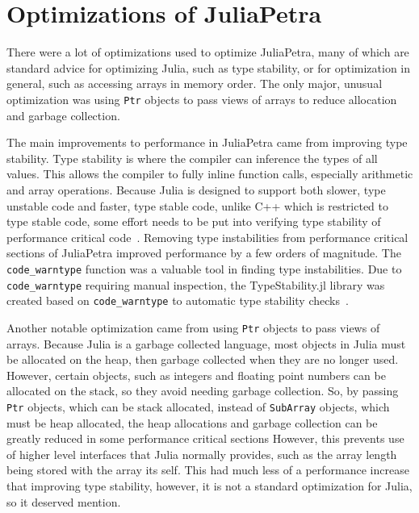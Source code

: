 \documentclass[acmsmall]{acmart}
\newcommand{\snippet}[1]{\lstinline{#1}}
\begin{document}
	\section{Optimizations of JuliaPetra}
	
	There were a lot of optimizations used to optimize JuliaPetra, many of which are standard advice for optimizing Julia, such as type stability, or for optimization in general, such as accessing arrays in memory order.
	The only major, unusual optimization was using \snippet{Ptr} objects to pass views of arrays to reduce allocation and garbage collection.
	
	The main improvements to performance in JuliaPetra came from improving type stability.
	Type stability is where the compiler can inference the types of all values.
	This allows the compiler to fully inline function calls, especially arithmetic and array operations.
	Because Julia is designed to support both slower, type unstable code and faster, type stable code,
	unlike C++ which is restricted to type stable code, some effort needs to be put into verifying
	type stability of performance critical code~\cite{Bezanson:2017:FreshApproach}.
	Removing type instabilities from performance critical sections of JuliaPetra improved performance
	by a few orders of magnitude.
	The \snippet{code_warntype} function was a valuable tool in finding type instabilities.
	Due to \snippet{code_warntype} requiring manual inspection, the TypeStability.jl library was created
	based on \snippet{code_warntype} to automatic type stability checks~\cite{Github:TypeStability.jl}.
	
	Another notable optimization came from using \snippet{Ptr} objects to pass views of arrays.
	Because Julia is a garbage collected language, most objects in Julia must be allocated on the heap,
	then garbage collected when they are no longer used.
	However, certain objects, such as integers and floating point numbers can be allocated on the stack,
	so they avoid needing garbage collection.
	So, by passing \snippet{Ptr} objects, which can be stack allocated,
	instead of \snippet{SubArray} objects, which must be heap allocated,
	the heap allocations and garbage collection can be greatly reduced in some performance critical sections
	However, this prevents use of higher level interfaces that Julia normally provides,
	such as the array length being stored with the array its self.
	This had much less of a performance increase that improving type stability,
	however, it is not a standard optimization for Julia, so it deserved mention.
	
\end{document}
